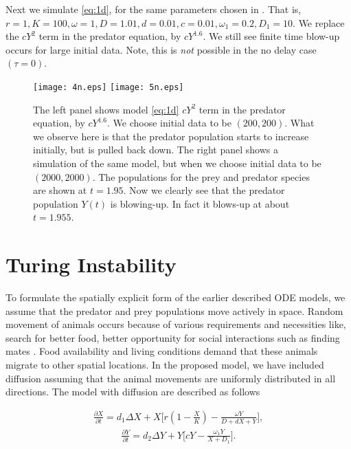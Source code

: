 \documentclass[10pt]{amsart}
\theoremstyle{definition}
\begin{document}
Next we simulate 
 \eqref{eq:1d}, for the same parameters chosen in \cite{RK15}. That is, $r=1, K=100, \omega=1, D=1.01, d=0.01, c=0.01, \omega_{1}=0.2, D_{1}=10$. We replace the $cY^2$ term in the predator equation, by $cY^{1.6}$. We still see finite time blow-up occurs for large initial data. Note, this is \emph{not} possible in the no delay case $(\tau=0)$.

\begin{figure}[htb]
{
\texttt{[image: 4n.eps]}}
{
\texttt{[image: 5n.eps]}}

\caption{The left panel shows model  \eqref{eq:1d} $cY^2$ term in the predator equation, by $cY^{1.6}$. We choose initial data to be $(200,200)$. What we observe here is that the predator population starts to increase initially, but is pulled back down. The right panel shows a simulation of the same model, but when we choose initial data to be $(2000,2000)$. The populations for the prey and predator species are shown at $t=1.95$. Now we clearly see that the predator population $Y(t)$ is blowing-up. In fact it blows-up at about $t=1.955$. }
\label{fig:1t1}
\end{figure}

\section{Turing Instability}
To formulate the spatially explicit form of the earlier described ODE models, we assume that the predator and prey populations move actively in space. Random movement of animals occurs because of various requirements and necessities like, search for better food, better opportunity for social interactions such as finding mates \cite{S97}. Food availability and living conditions demand that these animals migrate to other spatial locations. In the proposed model, we have included diffusion assuming that the animal movements are uniformly distributed in all directions. 
The model with diffusion are described as follows

\begin{align}
\label{eq:1di}
\frac{\partial X}{\partial t}=d_1 \Delta X + X\Bigg[r\left(1-\frac{X}{K}\right)-\frac{\omega  Y}{D+dX+Y}\Bigg],
\end{align}
\begin{align}
\label{eq:1di2}
\frac{\partial Y}{\partial t}=d_2 \Delta Y + Y\Bigg[cY-\frac{\omega_1 Y}{X+D_1}\Bigg].
\end{align}
\end{document}
